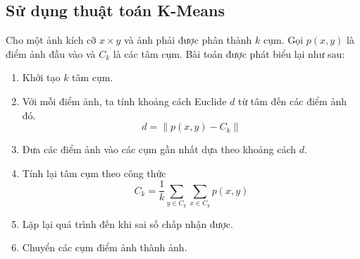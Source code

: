 \documentclass{article}
\begin{document}
    \subsection{Sử dụng thuật toán K-Means}
    Cho một ảnh kích cỡ $x \times y$ và ảnh phải được phân thành $k$ cụm. Gọi $p(x,y)$ là điểm ảnh đầu vào và $C_k$ là các tâm cụm.
    Bài toán được phát biểu lại như sau:
    \begin{enumerate}
        \item Khởi tạo $k$ tâm cụm.
        \item Với mỗi điểm ảnh, ta tính khoảng cách Euclide $d$ từ tâm đến các điểm ảnh đó.
        $$d = \lVert p(x,y) - C_k \rVert$$
        \item Đưa các điểm ảnh vào các cụm gần nhất dựa theo khoảng cách $d$.
        \item Tính lại tâm cụm theo công thức
        $$C_k = \frac{1}{k} \sum\limits_{y \in C_k} \sum\limits_{x \in C_k} p(x,y)$$
        \item Lặp lại quá trình đến khi sai số chấp nhận được.
        \item Chuyển các cụm điểm ảnh thành ảnh. 
    \end{enumerate}
\end{document}
